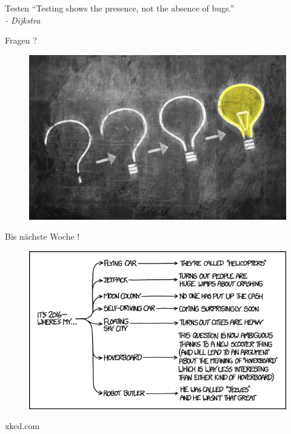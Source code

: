 \documentclass[18pt]{beamer}
\newcommand{\quotes}[1]{``#1''}
\begin{document}
\begin{frame}{Testen}
    \Large{\quotes{Testing shows the presence, not the absence of bugs.}}\\
    \vspace{.4in}
    \textit{- Dijkstra}
\end{frame}



\begin{frame}{Fragen ?}
    \begin{figure}
        \includegraphics[scale=.5]{img/question_to_idea.jpg}
    \end{figure}
\end{frame}

\appendix
\beginbackup

\begin{frame}{Bis nächste Woche !}
    \begin{figure}
        \includegraphics[scale=.5]{img/2016.png}
    \end{figure}

    \begin{flushright}
    \footnotesize{xkcd.com}
    \end{flushright}
\end{frame}

\backupend
\end{document}
